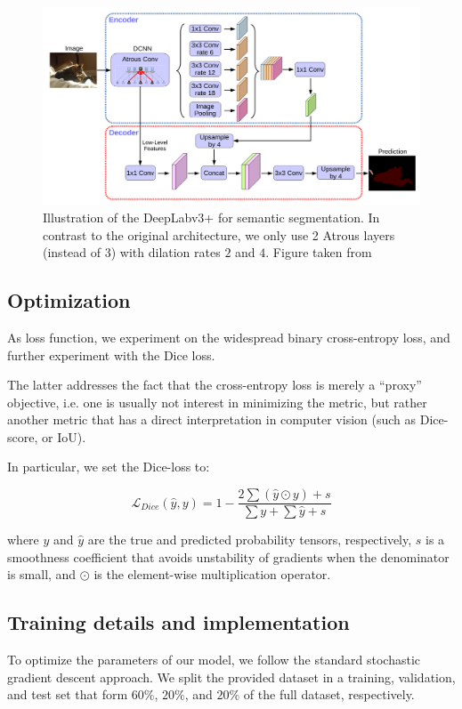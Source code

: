 \documentclass[11pt]{article}
\begin{document}
\begin{figure}[htbp]
\centering
\includegraphics[width=.9\linewidth]{./deeplabv3p.png}
\caption{\label{fig:deeplabv3p}Illustration of the DeepLabv3+ for semantic segmentation. In contrast to the original architecture, we only use 2 Atrous layers (instead of \(3\)) with dilation rates \(2\) and \(4\). Figure taken from \cite{chen18}}
\end{figure}


\subsection{Optimization}
\label{sec:org86c88d6}

As loss function, we experiment on the widespread binary cross-entropy loss,
and further experiment with the Dice loss.

The latter addresses the fact that the cross-entropy loss is merely a ``proxy'' objective,
i.e. one is usually not interest in minimizing the metric, but rather
another metric that has a direct interpretation in computer vision (such as Dice-score,
or IoU).

In particular, we set the Dice-loss to:

\[
\mathcal{L}_{Dice}(\hat{y}, y) = 1 - \frac{2 \sum (\hat{y} \odot y) + s}{\sum y + \sum \hat{y} + s}
\]

where \(y\) and \(\hat{y}\) are the true and predicted probability tensors, respectively,
\(s\) is a smoothness coefficient that avoids unstability of gradients when
the denominator is small, and \(\odot\) is the element-wise multiplication operator.

\subsection{Training details and implementation}
\label{sec:org6330d84}

To optimize the parameters of our model, we follow the standard stochastic gradient descent
approach.
We split the provided dataset in a training, validation, and test set
that form \(60\%\), \(20\%\), and \(20\%\) of the full dataset, respectively.
\end{document}
